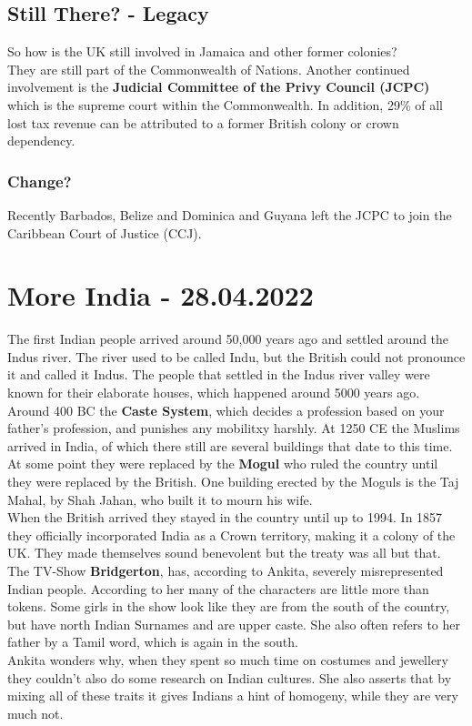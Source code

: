 \documentclass{article}
\begin{document}
	\subsection{Still There? - Legacy}
	So how is the UK still involved in Jamaica and other former colonies? \\
	They are still part of the Commonwealth of Nations. Another continued involvement is the \textbf{Judicial Committee of the Privy Council (JCPC)} which is the supreme court within the Commonwealth. In addition, 29\% of all lost tax revenue can be attributed to a former British colony or crown dependency. \\
	\subsubsection{Change?}
	Recently Barbados, Belize and Dominica and Guyana left the JCPC to join the Caribbean Court of Justice (CCJ).

	\section{More India - 28.04.2022}

	The first Indian people arrived around 50,000 years ago and settled around the Indus river. The river used to be called Indu, but the British could not pronounce it and called it Indus. The people that settled in the Indus river valley were known for their elaborate houses, which happened around 5000 years ago. \\
	Around 400 BC the \textbf{Caste System}, which decides a profession based on your father's profession, and punishes any mobilitxy harshly. At 1250 CE the Muslims arrived in India, of which there still are several buildings that date to this time. At some point they were replaced by the \textbf{Mogul} who ruled the country until they were replaced by the British. One building erected by the Moguls is the Taj Mahal, by Shah Jahan, who built it to mourn his wife. \\
	When the British arrived they stayed in the country until up to 1994. In 1857 they officially incorporated India as a Crown territory, making it a colony of the UK. They made themselves sound benevolent but the treaty was all but that. \\
	The TV-Show \textbf{Bridgerton}, has, according to Ankita, severely misrepresented Indian people. According to her many of the characters are little more than tokens. Some girls in the show look like they are from the south of the country, but have north Indian Surnames and are upper caste. She also often refers to her father by a Tamil word, which is again in the south. \\
	Ankita wonders why, when they spent so much time on costumes and jewellery they couldn't also do some research on Indian cultures. She also asserts that by mixing all of these traits it gives Indians a hint of homogeny, while they are very much not. \\
\end{document}
